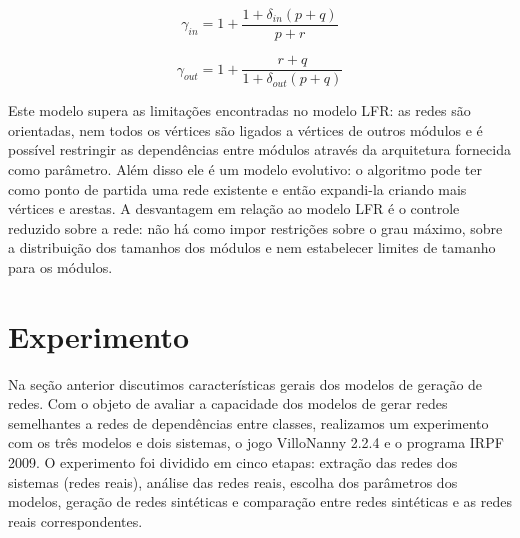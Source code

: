 \documentclass{acm_proc_article-sp}
\begin{document}
\begin{equation}
\gamma_{in} = 1 + \frac{1 + \delta_{in}(p + q)}{p + r}
\end{equation}

\begin{equation}
\gamma_{out} = 1 + \frac{r + q}{1 + \delta_{out}(p + q)}
\end{equation}


Este modelo supera as limitações encontradas no modelo LFR: as redes são orientadas, nem todos os vértices são ligados a vértices de outros módulos e é possível restringir as dependências entre módulos através da arquitetura fornecida como parâmetro. Além disso ele é um modelo evolutivo: o algoritmo pode ter como ponto de partida uma rede existente e então expandi-la criando mais vértices e arestas. A desvantagem em relação ao modelo LFR é o controle reduzido sobre a rede: não há como impor restrições sobre o grau máximo, sobre a distribuição dos tamanhos dos módulos e nem estabelecer limites de tamanho para os módulos.


\section{Experimento} \label{sec:experimento}

Na seção anterior discutimos características gerais dos modelos de geração de redes. Com o objeto de avaliar a capacidade dos modelos de gerar redes semelhantes a redes de dependências entre classes, realizamos um experimento com os três modelos e dois sistemas, o jogo VilloNanny 2.2.4 e o programa IRPF 2009. O experimento foi dividido em cinco etapas: extração das redes dos sistemas (redes reais), análise das redes reais, escolha dos parâmetros dos modelos, geração de redes sintéticas e comparação entre redes sintéticas e as redes reais correspondentes. 
\end{document}
